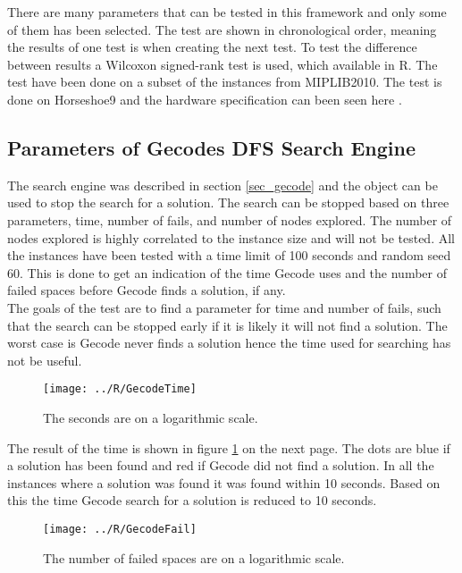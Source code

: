 There are many parameters that can be tested in this framework and only some of them has been selected. The test are 
shown in chronological order, meaning the results of one test is when creating the next test. To test the difference 
between results a Wilcoxon signed-rank test is used, which available in R. The test have been done on a subset of the 
instances from MIPLIB2010. The test is done on Horseshoe9 and the hardware specification can been seen here 
\cite{horse}.
\subsection{Parameters of Gecodes DFS Search Engine} \label{sub_gectest}
The search engine was described in section \ref{sec_gecode} and the  object can be used to 
stop the search for a solution. The search can be stopped based on three parameters, time, number of fails, and number 
of nodes explored. The number of nodes explored is highly correlated to the instance size and will not be tested. All 
the instances have been tested with a time limit of 100 seconds and random seed 60. This is done to get an indication 
of the time Gecode uses and the number of failed spaces before Gecode finds a solution, if any. \\ 
The goals of the test are to find a parameter for time and number of fails, such that the search can be stopped early 
if it is likely it will not find a solution. The worst case is Gecode never finds a solution hence the time used for 
searching has not be useful. \\
\begin{figure}[!h]
\centering
\texttt{[image: ../R/GecodeTime]} \caption{The seconds are on a logarithmic 
scale.}\label{fig_gecodetime}
\end{figure}\noindent
The result of the time is shown in figure \ref{fig_gecodetime} on the next page. The dots are blue if a solution has 
been found and red if Gecode did not find a solution. In all the instances where a solution was found it was found 
within 10 seconds. Based on this the time Gecode search for a solution is reduced to 10 seconds. \\ 
\begin{figure}[!h]
\centering
\texttt{[image: ../R/GecodeFail]} \caption{The number of failed spaces are on a logarithmic 
scale.}\label{fig_gecodefail}
\end{figure}\noindent
